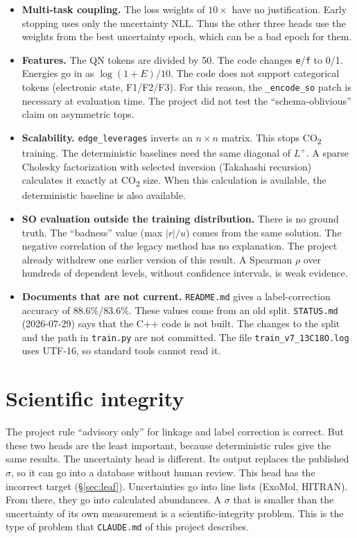 \documentclass[11pt,a4paper]{article}
\newcommand{\code}[1]{\texttt{#1}}
\begin{document}
\begin{itemize}
\item \textbf{Multi-task coupling.} The loss weights of $10\times$ have no
  justification. Early stopping uses only the uncertainty NLL. Thus the other three
  heads use the weights from the best uncertainty epoch, which can be a bad epoch for
  them.
\item \textbf{Features.} The QN tokens are divided by 50. The code changes
  \code{e}/\code{f} to 0/1. Energies go in as $\log(1+E)/10$. The code does not
  support categorical tokens (electronic state, F1/F2/F3). For this reason, the
  \code{\_encode\_so} patch is necessary at evaluation time. The project did not test
  the ``schema-oblivious'' claim on asymmetric tops.
\item \textbf{Scalability.} \code{edge\_leverages} inverts an $n\times n$ matrix. This
  stops CO\textsubscript{2} training. The deterministic baselines need the same
  diagonal of $L^{+}$. A sparse Cholesky factorization with selected inversion
  (Takahashi recursion) calculates it exactly at CO\textsubscript{2} size. When this
  calculation is available, the deterministic baseline is also available.
\item \textbf{SO evaluation outside the training distribution.} There is no ground
  truth. The ``badness'' value (max $|r|/u$) comes from the same solution. The negative
  correlation of the legacy method has no explanation. The project already withdrew
  one earlier version of this result. A Spearman $\rho$ over hundreds of dependent
  levels, without confidence intervals, is weak evidence.
\item \textbf{Documents that are not current.} \code{README.md} gives a
  label-correction accuracy of 88.6\%/83.6\%. These values come from an old split.
  \code{STATUS.md} (2026-07-29) says that the C++ code is not built. The changes to
  the split and the path in \code{train.py} are not committed. The file
  \code{train\_v7\_13C18O.log} uses UTF-16, so standard tools cannot read it.
\end{itemize}

\section{Scientific integrity}

The project rule ``advisory only'' for linkage and label correction is correct. But
these two heads are the least important, because deterministic rules give the same
results. The uncertainty head is different. Its output replaces the published
$\sigma$, so it can go into a database without human review. This head has the
incorrect target (\S\ref{sec:leaf}). Uncertainties go into line lists (ExoMol,
HITRAN). From there, they go into calculated abundances. A $\sigma$ that is smaller
than the uncertainty of its own measurement is a scientific-integrity problem. This is
the type of problem that \code{CLAUDE.md} of this project describes.
\end{document}
